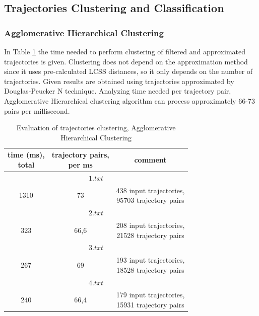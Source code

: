 \subsection{Trajectories Clustering and Classification}

\subsubsection{Agglomerative Hierarchical Clustering}

In Table \ref{table:clust_time} the time needed to perform clustering of filtered and approximated trajectories is given. Clustering does not depend on the approximation method since it uses pre-calculated LCSS distances, so it only depends on the number of trajectories. Given results are obtained using trajectories approximated by Douglas-Peucker N technique. Analyzing time needed per trajectory pair, Agglomerative Hierarchical clustering algorithm can process approximately 66-73 pairs per millisecond.

\begin{table}[!htb]
	\caption{Evaluation of trajectories clustering, Agglomerative Hierarchical Clustering}
	\label{table:clust_time}
	
	\setlength{\tabcolsep}{10pt}
	\centering
	\setcellgapes{3pt}\makegapedcells
	
	\begin{tabular}{||c|c|c||}
		\hline
		\makecell{time (ms),\\total} & \makecell{trajectory pairs,\\per ms} & comment \\[0.5ex]

		\hline
		\multicolumn{3}{||c||}{$1.txt$} \\[0.5ex]
		\hline
		1310 	& 73	& \makecell{438 input trajectories,\\95703 trajectory pairs} \\[0.5ex]

		\hline
		\multicolumn{3}{||c||}{$2.txt$} \\[0.5ex]
		\hline
		323 	& 66,6	& \makecell{208 input trajectories,\\21528 trajectory pairs} \\[0.5ex]

		\hline
		\multicolumn{3}{||c||}{$3.txt$} \\[0.5ex]
		\hline
		267 	& 69	& \makecell{193 input trajectories,\\18528 trajectory pairs} \\[0.5ex]

		\hline
		\multicolumn{3}{||c||}{$4.txt$} \\[0.5ex]
		\hline
		240 	& 66,4	& \makecell{179 input trajectories,\\15931 trajectory pairs} \\[0.5ex]
	
		\hline
	\end{tabular}
\end{table}

